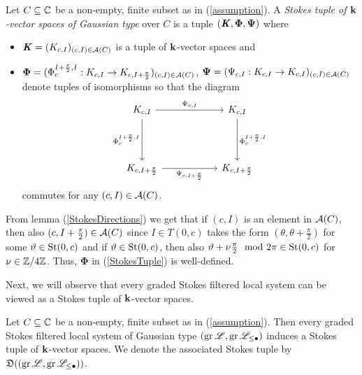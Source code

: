 \begin{defi}\label{StokesTuple}
    Let $C \subseteq \mathbb{C}$ be a non-empty, finite subset as in (\ref{assumption}). A \emph{Stokes tuple of $\mathbf{k}$-vector spaces of Gaussian type} over $C$ is a tuple $(\bm{\mathit{K}}, \mathbf{\Phi}, \mathbf{\Psi})$ where
    \begin{itemize}
        \item $\bm{\mathit{K}} = (K_{c,I})_{(c,I) \in \mathcal{A}(C)}$ is a tuple of $\mathbf{k}$-vector spaces and
        \item $\mathbf{\Phi} = (\Phi_c^{I+\frac{\pi}{2}, I}:K_{c,I} \to K_{c, I+\frac{\pi}{2}})_{(c,I) \in \mathcal{A}(C)}$, $\mathbf{\Psi} = (\Psi_{c,I}: K_{c,I} \to K_{c,I})_{(c,I) \in \mathcal{A}(C)}$ denote tuples of isomorphisms so that the diagram
    \[
        \begin{tikzcd}[row sep=1.5cm, column sep=2cm]
         & K_{c,I} \arrow[d, swap, "\Phi_{c}^{I+\frac{\pi}{2},I}"] \arrow[r, "\Psi_{c,I}"] & K_{c,I} \arrow[d, "\Phi_{c}^{I+\frac{\pi}{2},I}"] & \\
        & K_{c,I+\frac{\pi}{2}} \arrow[r, swap, "\Psi_{c,I+\frac{\pi}{2}}"] &  K_{c,I+\frac{\pi}{2}} & 
        \end{tikzcd}
    \]
    commutes for any $(c,I) \in \mathcal{A}(C)$.
\end{itemize}
\end{defi}

\begin{rem} From lemma (\ref{StokesDirections}) we get that if $(c, I)$ is an element in $\mathcal{A}(C)$, then also $(c, I+\frac{\pi}{2}) \in \mathcal{A}(C)$ since $I\in T(0,c)$ takes the form $(\theta, \theta + \frac{\pi}{2})$ for some $\vartheta \in \operatorname{St}(0,c)$ and if $\vartheta \in \operatorname{St}(0,c)$, then also $\vartheta + \nu \frac{\pi}{2} \mod 2\pi \in \operatorname{St}(0,c)$ for $\nu \in \mathbb{Z}/4\mathbb{Z}$. Thus, $\bm\Phi$ in (\ref{StokesTuple}) is well-defined.
\end{rem}

Next, we will observe that every graded Stokes filtered local system can be viewed as a Stokes tuple of $\mathbf{k}$-vector spaces.

\begin{lem}\label{gradedtotupel}
    Let $C \subseteq \mathbb{C}$ be a non-empty, finite subset as in (\ref{assumption}). Then every graded Stokes filtered local system of Gaussian type $(\operatorname{gr}\mathscr{L},\operatorname{gr}\mathscr{L}_{\leq \bullet})$ induces a Stokes tuple of $\mathbf{k}$-vector spaces. We denote the associated Stokes tuple by $\mathfrak{D}((\operatorname{gr}\mathscr{L},\operatorname{gr}\mathscr{L}_{\leq \bullet}))$.
\end{lem}

